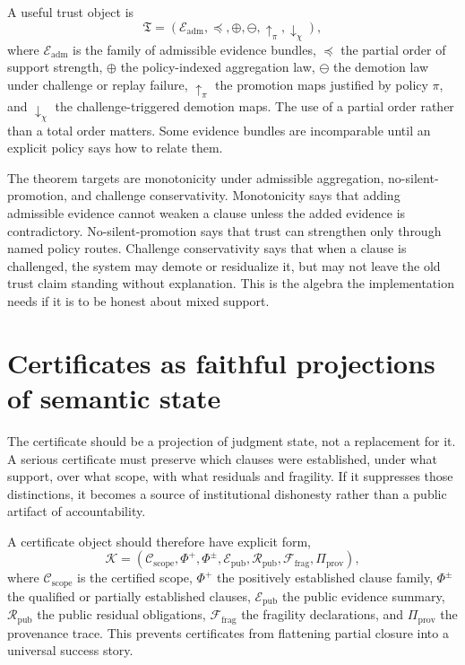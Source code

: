 \documentclass[11pt]{report}
\begin{document}
A useful trust object is
\[
\mathfrak{T} = (\mathcal{E}_{\mathrm{adm}}, \preceq, \oplus, \ominus, \uparrow_{\pi}, \downarrow_{\chi}),
\]
where $\mathcal{E}_{\mathrm{adm}}$ is the family of admissible evidence bundles, $\preceq$ the partial order of support strength, $\oplus$ the policy-indexed aggregation law, $\ominus$ the demotion law under challenge or replay failure, $\uparrow_{\pi}$ the promotion maps justified by policy $\pi$, and $\downarrow_{\chi}$ the challenge-triggered demotion maps. The use of a partial order rather than a total order matters. Some evidence bundles are incomparable until an explicit policy says how to relate them.

The theorem targets are monotonicity under admissible aggregation, no-silent-promotion, and challenge conservativity. Monotonicity says that adding admissible evidence cannot weaken a clause unless the added evidence is contradictory. No-silent-promotion says that trust can strengthen only through named policy routes. Challenge conservativity says that when a clause is challenged, the system may demote or residualize it, but may not leave the old trust claim standing without explanation. This is the algebra the implementation needs if it is to be honest about mixed support.
\section{Certificates as faithful projections of semantic state}
The certificate should be a projection of judgment state, not a replacement for it. A serious certificate must preserve which clauses were established, under what support, over what scope, with what residuals and fragility. If it suppresses those distinctions, it becomes a source of institutional dishonesty rather than a public artifact of accountability.

A certificate object should therefore have explicit form,
\[
\mathcal{K} = (\mathcal{C}_{\mathrm{scope}}, \Phi^{+}, \Phi^{\pm}, \mathcal{E}_{\mathrm{pub}}, \mathcal{R}_{\mathrm{pub}}, \mathcal{F}_{\mathrm{frag}}, \Pi_{\mathrm{prov}}),
\]
where $\mathcal{C}_{\mathrm{scope}}$ is the certified scope, $\Phi^{+}$ the positively established clause family, $\Phi^{\pm}$ the qualified or partially established clauses, $\mathcal{E}_{\mathrm{pub}}$ the public evidence summary, $\mathcal{R}_{\mathrm{pub}}$ the public residual obligations, $\mathcal{F}_{\mathrm{frag}}$ the fragility declarations, and $\Pi_{\mathrm{prov}}$ the provenance trace. This prevents certificates from flattening partial closure into a universal success story.
\end{document}
